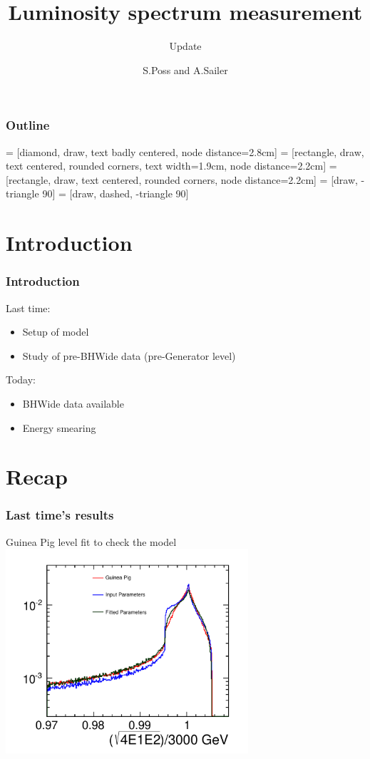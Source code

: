 \documentclass{beamer}
\author{S.Poss and A.Sailer}
\title{Luminosity spectrum measurement}
\subtitle{Update}
\begin{document}
\begin{frame}
\titlepage
\end{frame}
\begin{frame}
\frametitle{Outline}
\tableofcontents
\end{frame}
 = [diamond, draw, text badly centered, node distance=2.8cm]
 = [rectangle, draw, text centered, rounded corners, text width=1.9cm, node distance=2.2cm]
 = [rectangle, draw, text centered, rounded corners, node distance=2.2cm]
 = [draw, -triangle 90]
 = [draw, dashed, -triangle 90]
\section{Introduction}

\begin{frame}
\frametitle{Introduction}
Last time:
\begin{itemize}
  \item Setup of model
  \item Study of pre-BHWide data (pre-Generator level)
\end{itemize}
Today:
\begin{itemize}
  \item BHWide data available
  \item Energy smearing 
\end{itemize}
\end{frame}

\section{Recap}
\begin{frame}
\frametitle{Last time's results}
Guinea Pig level fit to check the model
\includegraphics[width=9cm]{../final_res}
\end{frame}
\end{document}
